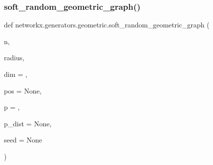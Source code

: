 \subsubsection{\texorpdfstring{soft\+\_\+random\+\_\+geometric\+\_\+graph()}{soft\_random\_geometric\_graph()}}
{\footnotesize\ttfamily def networkx.\+generators.\+geometric.\+soft\+\_\+random\+\_\+geometric\+\_\+graph (\begin{DoxyParamCaption}\item[{}]{n,  }\item[{}]{radius,  }\item[{}]{dim = {},  }\item[{}]{pos = {\ttfamily None},  }\item[{}]{p = {},  }\item[{}]{p\+\_\+dist = {\ttfamily None},  }\item[{}]{seed = {\ttfamily None} }\end{DoxyParamCaption})}

